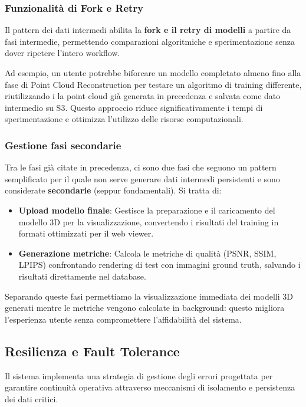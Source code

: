 \subsubsection{Funzionalità di Fork e Retry}
Il pattern dei dati intermedi abilita la \textbf{fork e il retry di modelli} a partire da fasi intermedie, permettendo comparazioni algoritmiche e sperimentazione senza dover ripetere l'intero workflow.

\noindent Ad esempio, un utente potrebbe biforcare un modello completato almeno fino alla fase di Point Cloud Reconstruction per testare un algoritmo di training differente, riutilizzando i la point cloud già generata in precedenza e salvata come dato intermedio su S3. Questo approccio riduce significativamente i tempi di sperimentazione e ottimizza l'utilizzo delle risorse computazionali.

\subsubsection{Gestione fasi secondarie}

Tra le fasi già citate in precedenza, ci sono due fasi che seguono un pattern semplificato per il quale non serve generare dati intermedi persistenti e sono considerate \textbf{secondarie} (seppur fondamentali). Si tratta di:

\begin{itemize}
	\item \textbf{Upload modello finale}: Gestisce la preparazione e il caricamento del modello 3D per la visualizzazione, convertendo i risultati del training in formati ottimizzati per il web viewer.
	
	\item \textbf{Generazione metriche}: Calcola le metriche di qualità (PSNR, SSIM, LPIPS) confrontando rendering di test con immagini ground truth, salvando i risultati direttamente nel database.
\end{itemize}

Separando queste fasi permettiamo la visualizzazione immediata dei modelli 3D generati mentre le metriche vengono calcolate in background: questo migliora l'esperienza utente senza compromettere l'affidabilità del sistema.

\subsection{Resilienza e Fault Tolerance}

Il sistema implementa una strategia di gestione degli errori progettata per garantire continuità operativa attraverso meccanismi di isolamento e persistenza dei dati critici.

